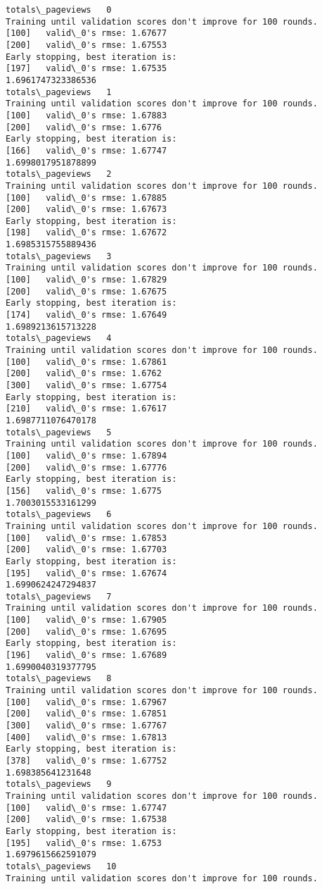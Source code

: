 \documentclass[11pt]{article}
\begin{document}
    \begin{Verbatim}[commandchars=\\\{\}]
totals\_pageviews   0
Training until validation scores don't improve for 100 rounds.
[100]	valid\_0's rmse: 1.67677
[200]	valid\_0's rmse: 1.67553
Early stopping, best iteration is:
[197]	valid\_0's rmse: 1.67535
1.6961747323386536
totals\_pageviews   1
Training until validation scores don't improve for 100 rounds.
[100]	valid\_0's rmse: 1.67883
[200]	valid\_0's rmse: 1.6776
Early stopping, best iteration is:
[166]	valid\_0's rmse: 1.67747
1.6998017951878899
totals\_pageviews   2
Training until validation scores don't improve for 100 rounds.
[100]	valid\_0's rmse: 1.67885
[200]	valid\_0's rmse: 1.67673
Early stopping, best iteration is:
[198]	valid\_0's rmse: 1.67672
1.6985315755889436
totals\_pageviews   3
Training until validation scores don't improve for 100 rounds.
[100]	valid\_0's rmse: 1.67829
[200]	valid\_0's rmse: 1.67675
Early stopping, best iteration is:
[174]	valid\_0's rmse: 1.67649
1.6989213615713228
totals\_pageviews   4
Training until validation scores don't improve for 100 rounds.
[100]	valid\_0's rmse: 1.67861
[200]	valid\_0's rmse: 1.6762
[300]	valid\_0's rmse: 1.67754
Early stopping, best iteration is:
[210]	valid\_0's rmse: 1.67617
1.6987711076470178
totals\_pageviews   5
Training until validation scores don't improve for 100 rounds.
[100]	valid\_0's rmse: 1.67894
[200]	valid\_0's rmse: 1.67776
Early stopping, best iteration is:
[156]	valid\_0's rmse: 1.6775
1.7003015533161299
totals\_pageviews   6
Training until validation scores don't improve for 100 rounds.
[100]	valid\_0's rmse: 1.67853
[200]	valid\_0's rmse: 1.67703
Early stopping, best iteration is:
[195]	valid\_0's rmse: 1.67674
1.6990624247294837
totals\_pageviews   7
Training until validation scores don't improve for 100 rounds.
[100]	valid\_0's rmse: 1.67905
[200]	valid\_0's rmse: 1.67695
Early stopping, best iteration is:
[196]	valid\_0's rmse: 1.67689
1.6990040319377795
totals\_pageviews   8
Training until validation scores don't improve for 100 rounds.
[100]	valid\_0's rmse: 1.67967
[200]	valid\_0's rmse: 1.67851
[300]	valid\_0's rmse: 1.67767
[400]	valid\_0's rmse: 1.67813
Early stopping, best iteration is:
[378]	valid\_0's rmse: 1.67752
1.698385641231648
totals\_pageviews   9
Training until validation scores don't improve for 100 rounds.
[100]	valid\_0's rmse: 1.67747
[200]	valid\_0's rmse: 1.67538
Early stopping, best iteration is:
[195]	valid\_0's rmse: 1.6753
1.6979615662591079
totals\_pageviews   10
Training until validation scores don't improve for 100 rounds.

\end{Verbatim}
\end{document}
